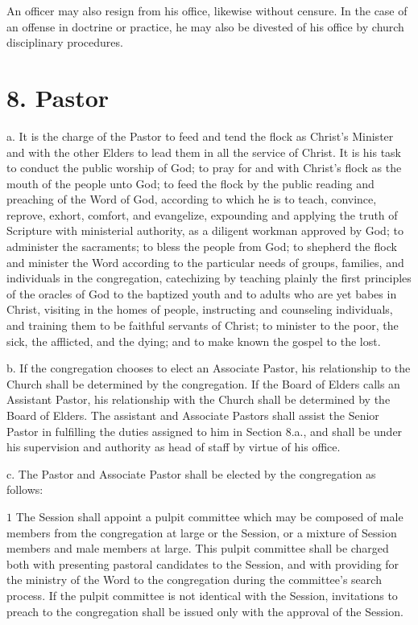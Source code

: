 \documentclass[
]{book}
\begin{document}
An officer may also resign from his office, likewise without censure. In the case of an offense in doctrine or practice, he may also be divested of his office by church disciplinary procedures.

\hypertarget{pastor}{%
\section{8. Pastor}\label{pastor}}

a. It is the charge of the Pastor to feed and tend the flock as Christ's Minister and with the other Elders to lead them in all the service of Christ. It is his task to conduct the public worship of God; to pray for and with Christ's flock as the mouth of the people unto God; to feed the flock by the public reading and preaching of the Word of God, according to which he is to teach, convince, reprove, exhort, comfort, and evangelize, expounding and applying the truth of Scripture with ministerial authority, as a diligent workman approved by God; to administer the sacraments; to bless the people from God; to shepherd the flock and minister the Word according to the particular needs of groups, families, and individuals in the congregation, catechizing by teaching plainly the first principles of the oracles of God to the baptized youth and to adults who are yet babes in Christ, visiting in the homes of people, instructing and counseling individuals, and training them to be faithful servants of Christ; to minister to the poor, the sick, the afflicted, and the dying; and to make known the gospel to the lost.

b. If the congregation chooses to elect an Associate Pastor, his relationship to the Church shall be determined by the congregation. If the Board of Elders calls an Assistant Pastor, his relationship with the Church shall be determined by the Board of Elders. The assistant and Associate Pastors shall assist the Senior Pastor in fulfilling the duties assigned to him in Section 8.a., and shall be under his supervision and authority as head of staff by virtue of his office.

c. The Pastor and Associate Pastor shall be elected by the congregation as follows:

\(1\) The Session shall appoint a pulpit committee which may be composed of male members from the congregation at large or the Session, or a mixture of Session members and male members at large. This pulpit committee shall be charged both with presenting pastoral candidates to the Session, and with providing for the ministry of the Word to the congregation during the committee's search process. If the pulpit committee is not identical with the Session, invitations to preach to the congregation shall be issued only with the approval of the Session.
\end{document}
